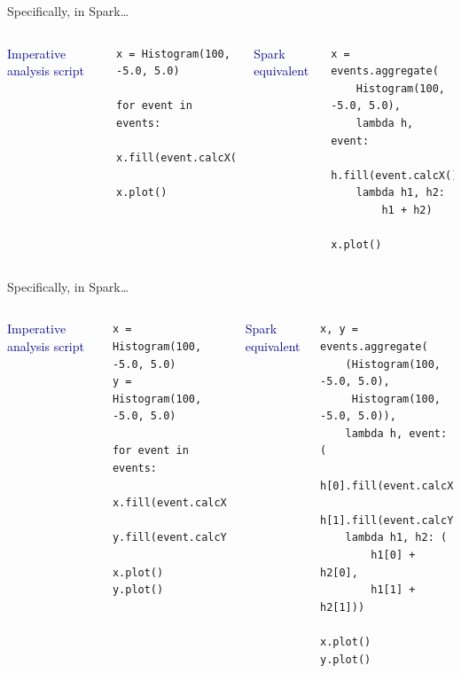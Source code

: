 \documentclass[aspectratio=169]{beamer}
\begin{document}
\begin{frame}[fragile]{Specifically, in Spark\ldots}
\vspace{0.5 cm}
\begin{columns}

\textcolor{darkblue}{Imperative analysis script}
\small
\begin{verbatim}
x = Histogram(100, -5.0, 5.0)

for event in events:
    x.fill(event.calcX())

x.plot()
\end{verbatim}

\textcolor{darkblue}{Spark equivalent}
\small
\begin{verbatim}
x = events.aggregate(
    Histogram(100, -5.0, 5.0),
    lambda h, event:
        h.fill(event.calcX()),
    lambda h1, h2:
        h1 + h2)

x.plot()
\end{verbatim}
\end{columns}
\end{frame}

\begin{frame}[fragile]{Specifically, in Spark\ldots}
\vspace{0.5 cm}
\begin{columns}

\textcolor{darkblue}{Imperative analysis script}
\small
\begin{verbatim}
x = Histogram(100, -5.0, 5.0)
y = Histogram(100, -5.0, 5.0)

for event in events:
    x.fill(event.calcX())
    y.fill(event.calcY())

x.plot()
y.plot()
\end{verbatim}

\textcolor{darkblue}{Spark equivalent}
\small
\begin{verbatim}
x, y = events.aggregate(
    (Histogram(100, -5.0, 5.0),
     Histogram(100, -5.0, 5.0)),
    lambda h, event: (
        h[0].fill(event.calcX()),
        h[1].fill(event.calcY())),
    lambda h1, h2: (
        h1[0] + h2[0],
        h1[1] + h2[1]))

x.plot()
y.plot()
\end{verbatim}
\end{columns}
\end{frame}
\end{document}
